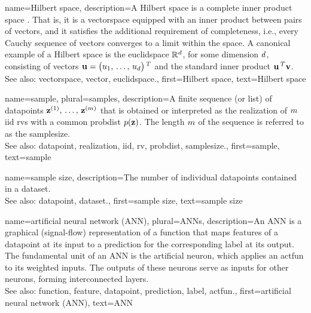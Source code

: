 {name={Hilbert space},
	description={A Hilbert space is a complete inner 
		product space \cite{introhilbertbook}. That is, it is a \gls{vectorspace} equipped 
		with an inner product between pairs of \glspl{vector}, and it satisfies the additional requirement 
		of completeness, i.e., every Cauchy sequence of \glspl{vector} converges to a limit within the space. 
		A canonical example of a Hilbert space is the \gls{euclidspace} $\mathbb{R}^{d}$, 
		for some dimension $d$, consisting of \glspl{vector} ${\bf u} = \big(u_1, \,\ldots, \,u_{d}\big)\,^{T}$ 
		and the standard inner product ${\bf u}\,^{T} {\bf v}$.
				\\
		See also: \gls{vectorspace}, \gls{vector}, \gls{euclidspace}.},
	first={Hilbert space},
	text={Hilbert space}
}



{name={sample}, plural={samples}, 
	description={A 
		finite sequence (or list) of \glspl{datapoint} ${\bf z}^{(1)}, \,\ldots, \,{\bf z}^{(m)}$ that 
		is obtained or interpreted as the \gls{realization} of $m$ \gls{iid} \glspl{rv} 
		with a common \gls{probdist} $p({\bf z})$. The length $m$ of 
		the sequence is referred to as the \gls{samplesize}.
				\\
		See also: \gls{datapoint}, \gls{realization}, \gls{iid}, \gls{rv}, \gls{probdist}, \gls{samplesize}.},
		first={sample},
		text={sample}
}
	
{name={sample size},
	description={The number of individual \glspl{datapoint} 
		contained in a \gls{dataset}.
				\\
		See also: \gls{datapoint}, \gls{dataset}.},
	first={sample size},
	text={sample size}
}

{name={artificial neural network (ANN)}, plural={ANNs},
	description={An ANN 
		is a graphical (signal-flow) representation of a \gls{function} that maps 
		\glspl{feature} of a \gls{datapoint} at its input to a \gls{prediction} 
		for the corresponding \gls{label} at its output. The fundamental unit of an 
		ANN is the artificial neuron, which applies an \gls{actfun} to its 
		weighted inputs. The outputs of these neurons serve as inputs for other neurons, 
		forming interconnected layers.
				\\
		See also: \gls{function}, \gls{feature}, \gls{datapoint}, \gls{prediction}, \gls{label}, \gls{actfun}.},
	first={artificial neural network (ANN)},
	text={ANN}
}


